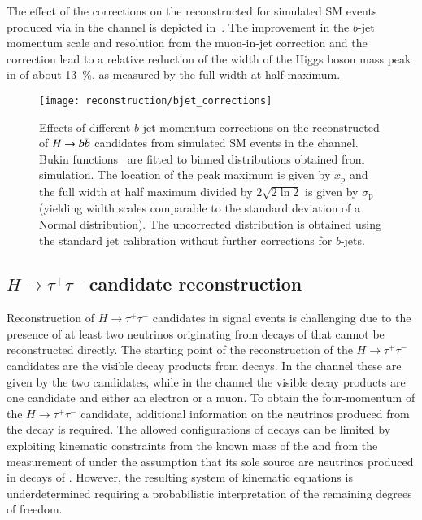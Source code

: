 The effect of the corrections on the reconstructed \mBB for simulated
SM \HH events produced via \ggF in the \hadhad channel is depicted
in~. The improvement in the $b$-jet
momentum scale and resolution from the muon-in-jet correction and the
\pTreco correction lead to a relative reduction of the width of the
Higgs boson mass peak in \mBB of about \SI{13}{\percent}, as measured
by the full width at half maximum.

\begin{figure}[htbp]
  \centering

  \texttt{[image: reconstruction/bjet\_corrections]}

  \caption{Effects of different $b$-jet momentum corrections on the
    reconstructed \mBB of $H \to b\bar{b}$ candidates from simulated SM
    \HH events in the \hadhad channel. Bukin
    functions~\cite{Bukin:2007zha} are fitted
    to binned distributions obtained from simulation. The location of
    the peak maximum is given by $x_{\text{p}}$ and the full width at
    half maximum divided by $2\sqrt{2 \ln 2}$ is given by
    $\sigma_{\text{p}}$ (yielding width scales comparable to the
    standard deviation of a Normal distribution). The uncorrected
    distribution is obtained using the standard jet calibration
    without further corrections for $b$-jets.}%
  \label{fig:bjet_momentum_corr_mbb}
\end{figure}


\subsection{$H \to \tau^{+}\tau^{-}$ candidate reconstruction}%
\label{sec:htautau_reco}

Reconstruction of $H \to \tau^{+}\tau^{-}$ candidates in signal events
is challenging due to the presence of at least two neutrinos
originating from decays of \tauleptons that cannot be reconstructed
directly. The starting point of the reconstruction of the
$H \to \tau^{+}\tau^{-}$ candidates are the visible decay products
from \taulepton decays. In the \hadhad channel these are given by the
two \tauhadvis candidates, while in the \lephad channel the visible
decay products are one \tauhadvis candidate and either an electron or
a muon. To obtain the four-momentum of the $H \to \tau^{+}\tau^{-}$
candidate, %
additional information on the neutrinos produced from the \taulepton
decay is required. The allowed configurations of \taulepton decays can
be limited by exploiting kinematic constraints from the known mass of
the \taulepton and from the measurement of \pTmiss under the
assumption that its sole source are neutrinos produced in decays of
\tauleptons. However, the resulting system of kinematic equations is
underdetermined requiring a probabilistic interpretation of the
remaining degrees of freedom.

